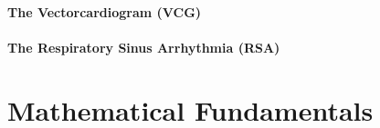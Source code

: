 \paragraph{The Vectorcardiogram (VCG)}
\label{vcg}
\paragraph{The Respiratory Sinus Arrhythmia (RSA)}
\label{rsa}







\section{Mathematical Fundamentals}
\label{mathematicalFundamentals}




